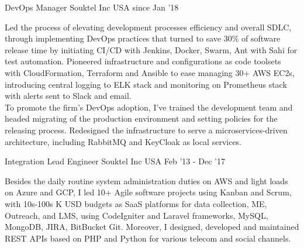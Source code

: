 
\begin{cventries}

  \cventry
    {DevOps Manager} %
    {Souktel Inc} %
    {USA} %
    {since Jan ’18} %
    {
      \begin{cvitems} %
        {Led the process of elevating development processes efficiency and overall SDLC, through implementing DevOps practices that turned to save 30\% of software release time by initiating CI/CD with Jenkins, Docker, Swarm, Ant with Sahi for test automation. Pioneered infrastructure and configurations as code toolsets with CloudFormation, Terraform and Ansible to ease managing 30+ AWS EC2s, introducing central logging to ELK stack and monitoring on Prometheus stack with alerts sent to Slack and email.\\
        To promote the firm's DevOps adoption, I've trained the development team and headed migrating of the production environment and setting policies for the releasing process. Redesigned the infrastructure to serve a microservices-driven architecture, including RabbitMQ and KeyCloak as local services.}
      \end{cvitems}
    }

\cventry
    {Integration Lead Engineer} %
    {Souktel Inc} %
    {USA} %
    {Feb ’13 - Dec ’17} %
    {
      \begin{cvitems} %
        {Besides the daily routine system administration duties on AWS and light loads on Azure and GCP, I led 10+ Agile software projects using Kanban and Scrum, with 10s-100s K USD budgets as SaaS platforms for data collection, ME, Outreach, and LMS, using CodeIgniter and Laravel frameworks, MySQL, MongoDB, JIRA, BitBucket Git. Moreover, I designed, developed and maintained REST APIs based on PHP and Python for various telecom and social channels.}
      \end{cvitems}
    }


\end{cventries}
